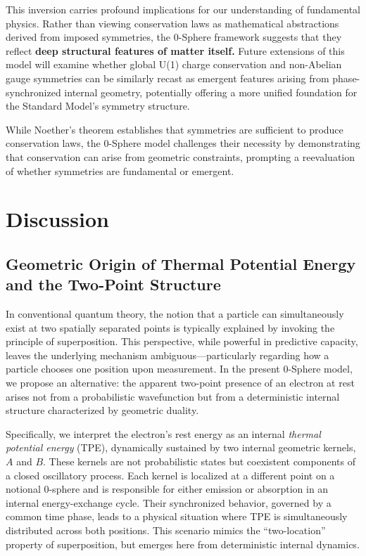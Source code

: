 \documentclass[%
 reprint,
 amsmath,amssymb,
 aps,
]{revtex4-1}
\numberwithin{equation}{section}%
\begin{document}
This inversion carries profound implications for our understanding of fundamental physics. Rather than viewing conservation laws as mathematical abstractions derived from imposed symmetries, the 0-Sphere framework suggests that they reflect \textbf{deep structural features of matter itself.} Future extensions of this model will examine whether global U(1) charge conservation and non-Abelian gauge symmetries can be similarly recast as emergent features arising from phase-synchronized internal geometry, potentially offering a more unified foundation for the Standard Model's symmetry structure.

While Noether’s theorem establishes that symmetries are sufficient to produce conservation laws, the 0-Sphere model challenges their necessity by demonstrating that conservation can arise from geometric constraints, prompting a reevaluation of whether symmetries are fundamental or emergent.


\section{Discussion}

\subsection{Geometric Origin of Thermal Potential Energy and the Two-Point Structure}

In conventional quantum theory, the notion that a particle can simultaneously exist at two spatially separated points is typically explained by invoking the principle of superposition. This perspective, while powerful in predictive capacity, leaves the underlying mechanism ambiguous—particularly regarding how a particle chooses one position upon measurement. In the present 0-Sphere model, we propose an alternative: the apparent two-point presence of an electron at rest arises not from a probabilistic wavefunction but from a deterministic internal structure characterized by geometric duality.

Specifically, we interpret the electron's rest energy as an internal \emph{thermal potential energy} (TPE), dynamically sustained by two internal geometric kernels, $A$ and $B$. These kernels are not probabilistic states but coexistent components of a closed oscillatory process. Each kernel is localized at a different point on a notional 0-sphere and is responsible for either emission or absorption in an internal energy-exchange cycle. Their synchronized behavior, governed by a common time phase, leads to a physical situation where TPE is simultaneously distributed across both positions. This scenario mimics the “two-location” property of superposition, but emerges here from deterministic internal dynamics.
\end{document}
